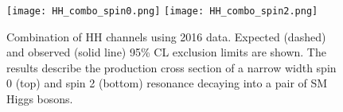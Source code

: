 \begin{figure}[H]%
  \begin{center}
    \texttt{[image: HH\_combo\_spin0.png]}
    \texttt{[image: HH\_combo\_spin2.png]}
    \caption{ Combination of HH channels using 2016 data. Expected (dashed) and observed (solid line) 95\% CL exclusion limits are shown. The results describe the production cross section of a narrow width spin 0 (top) and spin 2 (bottom) resonance decaying into a pair of SM Higgs bosons.  }
    \label{HH_combo}
  \end{center}
\end{figure}





%
%


